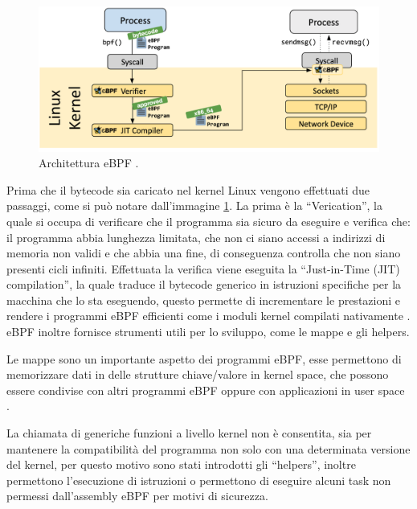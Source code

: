 \begin{figure}[]
    \label{fig:ebpf}
    \includegraphics[width=\hsize]{images/mitigazione/ebpf_architecture.png}
    \caption{Architettura eBPF \cite{ebpf.io}.}
    \centering
\end{figure}

Prima che il bytecode sia caricato nel kernel Linux vengono effettuati due passaggi, come si può notare dall'immagine \ref{fig:ebpf}. La prima è la ``Verication'', la quale si occupa di verificare che il programma sia sicuro da eseguire e verifica che: il programma abbia lunghezza limitata, che non ci siano accessi a indirizzi di memoria non validi e che abbia una fine, di conseguenza controlla che non siano presenti cicli infiniti. 
Effettuata la verifica viene eseguita la ``Just-in-Time (JIT) compilation'', la quale traduce il bytecode generico in istruzioni specifiche per la macchina che lo sta eseguendo, questo permette di incrementare le prestazioni e rendere i programmi eBPF efficienti come i moduli kernel compilati nativamente \cite{ebpf.io}.
eBPF inoltre fornisce strumenti utili per lo sviluppo, come le mappe e gli helpers.

Le mappe sono un importante aspetto dei programmi eBPF, esse permettono di memorizzare dati in delle strutture chiave/valore in kernel space, che possono essere condivise con altri programmi eBPF oppure con applicazioni in user space \cite{cilium_ebpf}.

La chiamata di generiche funzioni a livello kernel non è consentita, sia per mantenere la compatibilità del programma non solo con una determinata versione del kernel, per questo motivo sono stati introdotti gli ``helpers'', inoltre permettono l'esecuzione di istruzioni o permettono di eseguire alcuni task non permessi dall'assembly eBPF per motivi di sicurezza.

